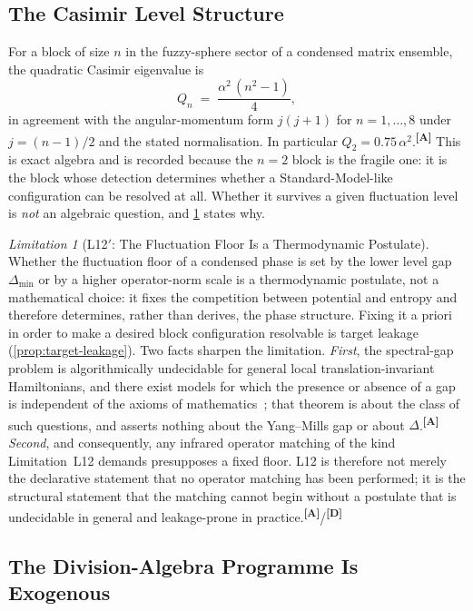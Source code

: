 \documentclass[12pt,a4paper,twoside]{article}
\theoremstyle{plain}
\theoremstyle{definition}
\theoremstyle{remark}
\newtheorem{limitation}[theorem]{Limitation}
\newcommand{\catmark}[1]{\textsuperscript{\textsf{\textbf{[#1]}}}}
\begin{document}
\subsection{The Casimir Level Structure}
\label{subsec:casimir-levels}

For a block of size $n$ in the fuzzy-sphere sector of a condensed matrix
ensemble, the quadratic Casimir eigenvalue is
\begin{equation}
 Q_n \;=\; \frac{\alpha^2\,(n^2-1)}{4},
 \label{eq:casimir}
\end{equation}
in agreement with the angular-momentum form $j(j+1)$ for $n = 1,\ldots,8$
under $j = (n-1)/2$ and the stated normalisation. In particular
$Q_2 = 0.75\,\alpha^2$.\catmark{A} This is exact algebra and is recorded
because the $n=2$ block is the fragile one: it is the block whose
detection determines whether a Standard-Model-like configuration can be
resolved at all. Whether it survives a given fluctuation level is
\emph{not} an algebraic question, and \cref{lim:L12x} states why.

\begin{limitation}[L12$'$: The Fluctuation Floor Is a Thermodynamic Postulate]
\label{lim:L12x}
Whether the fluctuation floor of a condensed phase is set by the lower
level gap $\Delta_{\min}$ or by a higher operator-norm scale is a
thermodynamic postulate, not a mathematical choice: it fixes the
competition between potential and entropy and therefore determines,
rather than derives, the phase structure. Fixing it a priori in order to
make a desired block configuration resolvable is target leakage
(\cref{prop:target-leakage}). Two facts sharpen the limitation.
\emph{First}, the spectral-gap problem is algorithmically undecidable for
general local translation-invariant Hamiltonians, and there exist models
for which the presence or absence of a gap is independent of the axioms
of mathematics~\cite{cubitt2015}; that theorem is about the class of such
questions, and asserts nothing about the Yang--Mills gap or about
$\Delta$.\catmark{A} \emph{Second}, and consequently, any infrared
operator matching of the kind Limitation~L12 demands presupposes a fixed
floor. L12 is therefore not merely the declarative statement that no
operator matching has been performed; it is the structural statement that
the matching cannot begin without a postulate that is undecidable in
general and leakage-prone in practice.\catmark{A}/\catmark{D}
\end{limitation}

\subsection{The Division-Algebra Programme Is Exogenous}
\label{subsec:division-exogeneity}
\end{document}
